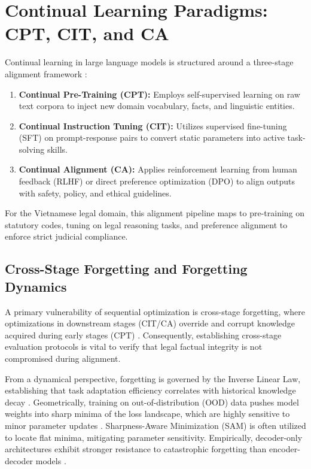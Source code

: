 \section{Continual Learning Paradigms: CPT, CIT, and CA}

Continual learning in large language models is structured around a three-stage alignment framework \parencite{wu2024continuallearninglargelanguage}:
\begin{enumerate}
    \item \textbf{Continual Pre-Training (CPT):} Employs self-supervised learning on raw text corpora to inject new domain vocabulary, facts, and linguistic entities.
    \item \textbf{Continual Instruction Tuning (CIT):} Utilizes supervised fine-tuning (SFT) on prompt-response pairs to convert static parameters into active task-solving skills.
    \item \textbf{Continual Alignment (CA):} Applies reinforcement learning from human feedback (RLHF) or direct preference optimization (DPO) to align outputs with safety, policy, and ethical guidelines.
\end{enumerate}
For the Vietnamese legal domain, this alignment pipeline maps to pre-training on statutory codes, tuning on legal reasoning tasks, and preference alignment to enforce strict judicial compliance.

\subsection{Cross-Stage Forgetting and Forgetting Dynamics}
A primary vulnerability of sequential optimization is cross-stage forgetting, where optimizations in downstream stages (CIT/CA) override and corrupt knowledge acquired during early stages (CPT) \parencite{wu2024continuallearninglargelanguage}. Consequently, establishing cross-stage evaluation protocols is vital to verify that legal factual integrity is not compromised during alignment.

From a dynamical perspective, forgetting is governed by the Inverse Linear Law, establishing that task adaptation efficiency correlates with historical knowledge decay \parencite{kalajdzievski2024scalinglawsforgettingfinetuning}. Geometrically, training on out-of-distribution (OOD) data pushes model weights into sharp minima of the loss landscape, which are highly sensitive to minor parameter updates \parencite{li2024revisitingcatastrophicforgettinglarge}. Sharpness-Aware Minimization (SAM) is often utilized to locate flat minima, mitigating parameter sensitivity. Empirically, decoder-only architectures exhibit stronger resistance to catastrophic forgetting than encoder-decoder models \parencite{luo2025empiricalstudycatastrophicforgetting}.

